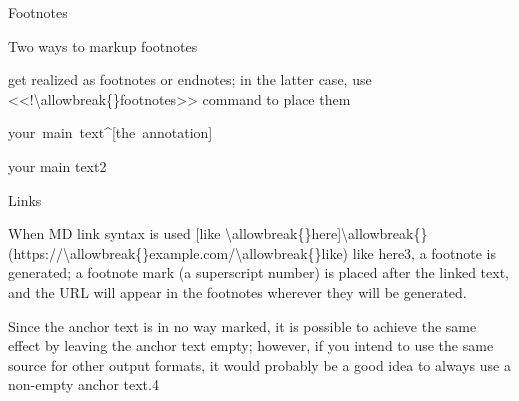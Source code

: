 {\mktsHThree{}Footnotes\mktsHThreeBeg}%

\vspace{\parskip}%
\begin{multicols}{2}\raggedcolumns{}Two ways to markup footnotes

get realized as footnotes or endnotes; in the latter case, use {\mktsStyleCode{}<<!\textbackslash{}allowbreak\{\}footnotes>>}
command to place them

\null\par{\mktsTightParagraphs{}

{\mktsStyleCode{}your main text\textasciicircum{}[the annotation]\par
}

}your main text{\mktsEnStyleMarkMain{}2}


\end{multicols}

{\mktsHThree{}Links\mktsHThreeBeg}%

\vspace{\parskip}%
\begin{multicols}{2}\raggedcolumns{}
When MD link syntax is used {\mktsStyleCode{}[like \textbackslash{}allowbreak\{\}here]\textbackslash{}allowbreak\{\}(https://\textbackslash{}allowbreak\{\}example.com/\textbackslash{}allowbreak\{\}like)}
{\mktsStyleLinklabel{}like here}{\mktsEnStyleMarkMain{}3}, a footnote is generated; a footnote mark
(a superscript number) is placed after the linked text, and the URL will appear in
the footnotes wherever they will be generated.

Since the anchor text is in no way
marked, it is possible to achieve the same effect by leaving the anchor text
empty; however, if you intend to use the same source for other output formats,
it would probably be a good idea to always use a non-empty anchor text.{\mktsEnStyleMarkMain{}4}

\end{multicols}

